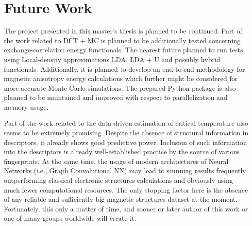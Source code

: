 \section{Future Work}

The project presented in this master's thesis is planned to be continued.
Part of the work related to DFT + MC  is planned to be additionally tested concerning exchange-correlation energy functionals. The nearest future planned to run tests using Local-density approximations LDA, LDA + U and possibly hybrid functionals. Additionally, it is planned to develop an end-to-end methodology for magnetic anisotropy energy calculations which further might be considered for more accurate Monte Carlo simulations. The prepared Python package is also planned to be maintained and improved with respect to parallelization and memory usage.

Part of the work related to the data-driven estimation of critical temperature also seems to be extremely promising. Despite the absence of structural information in descriptors, it already shows good predictive power. Inclusion of such information into the descriptors is already well-established practice by the source of various fingerprints. At the same time, the usage of modern architectures of Neural Networks (i.e., Graph Convolutional NN) may lead to stunning results frequently outperforming classical electronic structures calculations and obviously using much fewer computational resources. The only stopping factor here is the absence of any reliable and sufficiently big magnetic structures dataset at the moment. Fortunately, this only a matter of time, and sooner or later author of this work or one of many groups worldwide will create it.

\cleardoublepage
